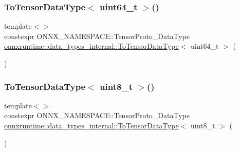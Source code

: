 \subsubsection{\texorpdfstring{To\+Tensor\+Data\+Type$<$ uint64\+\_\+t $>$()}{ToTensorDataType< uint64\_t >()}}
{\footnotesize\ttfamily template$<$$>$ \\
constexpr O\+N\+N\+X\+\_\+\+N\+A\+M\+E\+S\+P\+A\+C\+E\+::\+Tensor\+Proto\+\_\+\+Data\+Type \mbox{\hyperlink{namespaceonnxruntime_1_1data__types__internal_a083dfe9320ee42949a5284c6989a79d1}{onnxruntime\+::data\+\_\+types\+\_\+internal\+::\+To\+Tensor\+Data\+Type}}$<$ uint64\+\_\+t $>$ (\begin{DoxyParamCaption}{ }\end{DoxyParamCaption})}

\mbox{\label{namespaceonnxruntime_1_1data__types__internal_ad4eb8f9cf6acf01d5824265454b7b223}} 
\subsubsection{\texorpdfstring{To\+Tensor\+Data\+Type$<$ uint8\+\_\+t $>$()}{ToTensorDataType< uint8\_t >()}}
{\footnotesize\ttfamily template$<$$>$ \\
constexpr O\+N\+N\+X\+\_\+\+N\+A\+M\+E\+S\+P\+A\+C\+E\+::\+Tensor\+Proto\+\_\+\+Data\+Type \mbox{\hyperlink{namespaceonnxruntime_1_1data__types__internal_a083dfe9320ee42949a5284c6989a79d1}{onnxruntime\+::data\+\_\+types\+\_\+internal\+::\+To\+Tensor\+Data\+Type}}$<$ uint8\+\_\+t $>$ (\begin{DoxyParamCaption}{ }\end{DoxyParamCaption})}

